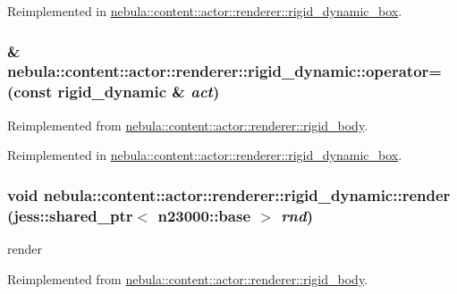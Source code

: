 Reimplemented in \hyperlink{classnebula_1_1content_1_1actor_1_1renderer_1_1rigid__dynamic__box_a73d0f162b01df6a9f025d51477d37789}{nebula::content::actor::renderer::rigid\_\-dynamic\_\-box}.\hypertarget{classnebula_1_1content_1_1actor_1_1renderer_1_1rigid__dynamic_ae90eb12e9f68833bd1bf0b8360332f49}{
\subsubsection[{operator=}]{ \& nebula::content::actor::renderer::rigid\_\-dynamic::operator= (const {\bf rigid\_\-dynamic} \& {\em act})}}
\label{classnebula_1_1content_1_1actor_1_1renderer_1_1rigid__dynamic_ae90eb12e9f68833bd1bf0b8360332f49}


Reimplemented from \hyperlink{classnebula_1_1content_1_1actor_1_1renderer_1_1rigid__body_a448e47741d24ba24fbedbd7438159a12}{nebula::content::actor::renderer::rigid\_\-body}.

Reimplemented in \hyperlink{classnebula_1_1content_1_1actor_1_1renderer_1_1rigid__dynamic__box_a26efbc775da4307f9294dab260b43723}{nebula::content::actor::renderer::rigid\_\-dynamic\_\-box}.\hypertarget{classnebula_1_1content_1_1actor_1_1renderer_1_1rigid__dynamic_a80f2984c2dadef15360b53cf3d05286c}{
\subsubsection[{render}]{\setlength{\rightskip}{0pt plus 5cm}void nebula::content::actor::renderer::rigid\_\-dynamic::render (jess::shared\_\-ptr$<$ {\bf n23000::base} $>$ {\em rnd})}}
\label{classnebula_1_1content_1_1actor_1_1renderer_1_1rigid__dynamic_a80f2984c2dadef15360b53cf3d05286c}


render 

Reimplemented from \hyperlink{classnebula_1_1content_1_1actor_1_1renderer_1_1rigid__body_ae3a3c72c7306b9ee55eb75abf36e7476}{nebula::content::actor::renderer::rigid\_\-body}.

